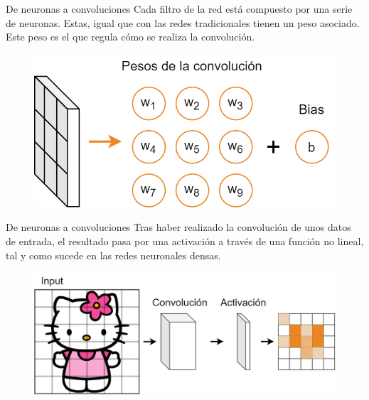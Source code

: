 \begin{frame}{De neuronas a convoluciones}
Cada \alert{filtro} de la red está compuesto por una serie de \alert{neuronas}. Estas, igual que con las redes \alert{tradicionales} tienen un \alert{peso} asociado. Este peso es el que regula cómo se realiza la \alert{convolución}.

\begin{figure}
    \centering
    \includegraphics[width=\textwidth]{Slides/figures/Tema 3/ConvNeuron.png}
\end{figure}
\end{frame}

\begin{frame}{De neuronas a convoluciones}
Tras haber realizado la \alert{convolución} de unos datos de entrada, el resultado pasa por una \alert{activación} a través de una \alert{función no lineal}, tal y como sucede en las redes neuronales densas.

\begin{figure}
    \centering
    \includegraphics[width=\textwidth]{Slides/figures/Tema 3/ConvActivation.png}
\end{figure}
\end{frame}

